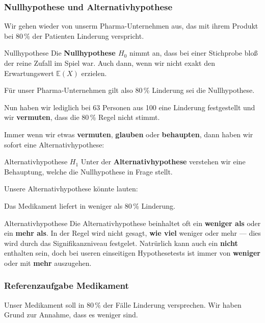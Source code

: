
\subsubsection{Nullhypothese und Alternativhypothese}

Wir gehen wieder von unserm Pharma-Unternehmen aus, das mit ihrem
Produkt bei 80\,\% der Patienten Linderung verspricht.



\begin{definition}{Nullhypothese}{}
Die \textbf{Nullhypothese $H_0$} nimmt an, dass bei einer Stichprobe
bloß der reine Zufall im Spiel war. Auch dann, wenn wir nicht exakt
den Erwartungswert $\mathbb{E}(X)$ erzielen.
\end{definition}

Für unser Pharma-Unternehmen gilt also 80\,\% Linderung sei die
Nullhypothese.


Nun haben wir lediglich bei 63 Personen aus 100 eine Linderung festgestellt und wir \textbf{vermuten}, dass die 80\,\% Regel nicht stimmt.

Immer wenn wir etwas \textbf{vermuten}, \textbf{glauben} oder \textbf{behaupten}, dann haben wir sofort eine Alternativhypothese:


\begin{definition}{Alternativhypothese $H_1$}{}
Unter der \textbf{Alternativhypothese} verstehen wir eine Behauptung, welche die Nullhypothese in Frage stellt.
\end{definition}

Unsere Alternativhypothese könnte lauten:

\begin{center}Das Medikament liefert in weniger als 80\,\% Linderung.\end{center}

\begin{bemerkung}{Alternativhypothese}{}
  Die Alternativhypothese beinhaltet oft ein \textbf{weniger als} oder ein \textbf{mehr als}. In der Regel wird nicht gesagt, \textbf{wie viel} weniger oder mehr --- dies wird durch das Signifikanzniveau festgelet. Natrürlich kann auch ein \textbf{nicht} enthalten sein, doch bei useren einseitigen Hypothesetests ist immer von \textbf{weniger} oder mit \textbf{mehr} auszugehen.
\end{bemerkung}

\newpage
\subsubsection{Referenzaufgabe Medikament}
Unser Medikament soll in 80\,\% der Fälle Linderung versprechen. Wir haben Grund zur Annahme, dass es weniger sind.

